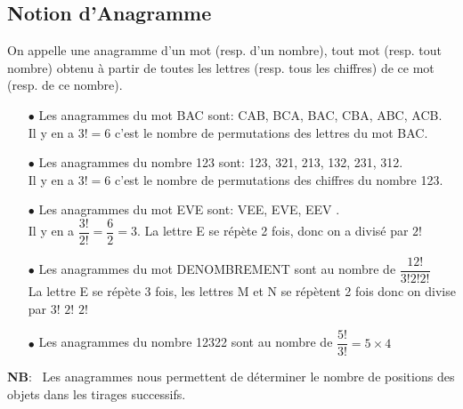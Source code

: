 \subsection*{Notion d'Anagramme}
\begin{definition}
On appelle une  anagramme d'un mot (resp. d'un nombre), tout mot (resp. tout nombre) obtenu à partir de toutes les lettres (resp. tous les chiffres) de ce mot (resp. de ce nombre).
\end{definition}
\begin{example}
\begin{itemize}
\item[$  \bullet$] Les anagrammes du mot BAC sont: CAB, BCA, BAC, CBA, ABC, ACB.\\
Il y en a $ 3!=6 $\; c'est le nombre de permutations des lettres du mot BAC.\\
\item[$  \bullet$] Les anagrammes du nombre 123 sont: 123, 321, 213, 132, 231, 312.\\
Il y en a $ 3!=6 $\; c'est le nombre de permutations des chiffres du nombre 123.\\
\item[$  \bullet$] Les anagrammes du mot EVE sont: VEE, EVE, EEV .\\
Il y en a $ \dfrac{3!}{2!}=\dfrac{6}{2} =3$. La lettre E se répète  2 fois, donc on a divisé par $ 2! $ \\
\item[$  \bullet$] Les anagrammes du mot DENOMBREMENT sont au nombre de $ \dfrac{12!}{3! 2!2!} $\\ La lettre E  se répète  3 fois, les lettres  M et N se répètent  2 fois donc on divise par $3! $ $ 2! $ $2! $\\
\item[$  \bullet$] Les anagrammes du nombre 12322 sont au nombre de $ \dfrac{5!}{3!}=5 \times4 $

\end{itemize}
\end{example}
\medskip

\textbf{NB}:~ Les anagrammes nous  permettent de déterminer le nombre de positions des objets dans les tirages successifs.

